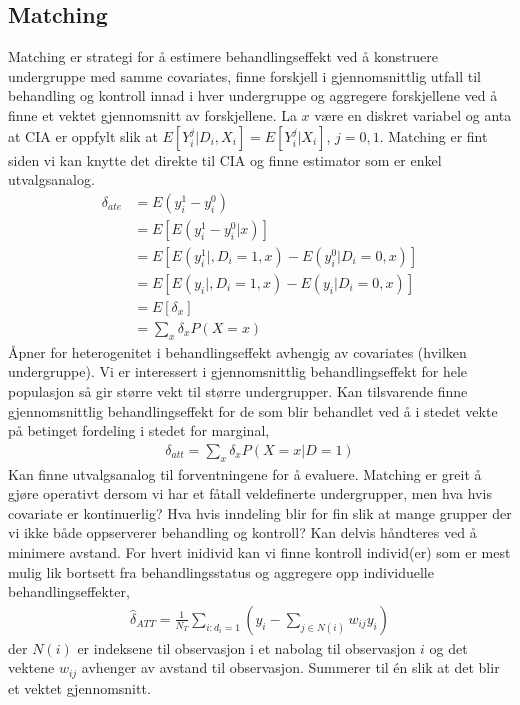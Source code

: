 \subsection{Matching}
Matching er strategi for å estimere behandlingseffekt ved å konstruere undergruppe med samme covariates, finne forskjell i gjennomsnittlig utfall til behandling og kontroll innad i hver undergruppe og aggregere forskjellene ved å finne et vektet gjennomsnitt av forskjellene. La $x$ være en diskret variabel og anta at CIA er oppfylt slik at $E[Y_i^j|D_i,X_i] = E[Y_i^j|X_i]$, $j=0,1$. Matching er fint siden vi kan knytte det direkte til CIA og finne estimator som er enkel utvalgsanalog. 
\begin{align}
\delta_{ate} &= E(y_i^1-y_i^0) \\
&= E[E(y_i^1-y_i^0|x)] \\
&=E[E(y_i^1|,D_i=1,x)-E(y_i^0|D_i=0,x)] \\
&=E[E(y_i|,D_i=1,x)-E(y_i|D_i=0,x)] \\
&= E[\delta_x] \\
&= \sum_x \delta_x P(X=x)
\end{align}
Åpner for heterogenitet i behandlingseffekt avhengig av covariates (hvilken undergruppe). Vi er interessert i gjennomsnittlig behandlingseffekt for hele populasjon så gir større vekt til større undergrupper. Kan tilsvarende finne gjennomsnittlig behandlingseffekt for de som blir behandlet ved å i stedet vekte på betinget fordeling i stedet for marginal,
\begin{align}
\delta_{att} = \sum_x \delta_x P(X=x|D=1)
\end{align}
Kan finne utvalgsanalog til forventningene for å evaluere. Matching er greit å gjøre operativt dersom vi har et fåtall veldefinerte undergrupper, men hva hvis covariate er kontinuerlig? Hva hvis inndeling blir for fin slik at mange grupper der vi ikke både oppserverer behandling og kontroll? Kan delvis håndteres ved å minimere avstand. For hvert inidivid kan vi finne kontroll individ(er) som er mest mulig lik bortsett fra behandlingsstatus og aggregere opp individuelle behandlingseffekter,
\begin{align}
\hat{\delta}_{ATT} = \frac{1}{N_T}\sum_{i:d_i=1}\left(y_i-\sum_{j\in N(i)}w_{ij}y_i\right)
\end{align}
der $N(i)$ er indeksene til observasjon i et nabolag til observasjon $i$ og det vektene $w_{ij}$ avhenger av avstand til observasjon. Summerer til én slik at det blir et vektet gjennomsnitt.
